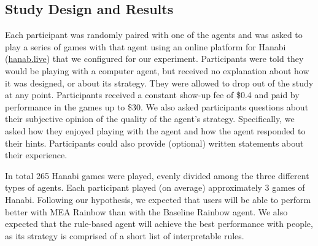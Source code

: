 \documentclass[letterpaper]{article} %
\begin{document}
\subsection{Study Design and Results}
Each participant was randomly paired with one of the agents and was asked to play a series of games with that agent  using an online  platform for Hanabi (\url{hanab.live}) that we configured for our experiment.  Participants were told they would be playing with a computer agent, but  received no explanation about how it was designed, or about its strategy. They were allowed to drop out of the study at any point. Participants received a constant show-up fee of \$0.4 and paid by performance in the games up to \$30.  %
We also asked participants  questions about their subjective opinion of the quality of the agent's strategy. Specifically, we asked  how they enjoyed playing with the agent and how the agent responded to their hints. Participants could also provide (optional) written statements about their experience. 


In total 265 Hanabi games were played,  evenly divided among the three different types of agents.  
Each participant played (on average) approximately 3 games of Hanabi. 
Following our hypothesis, we  expected that users will be able to perform better with MEA Rainbow than with the Baseline Rainbow agent. We also expected that the rule-based agent will achieve the best performance with people,  as its strategy is comprised of a short list of   interpretable rules. 
\end{document}
